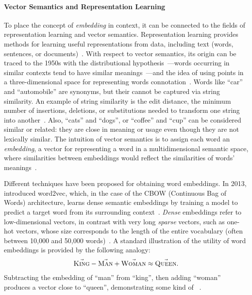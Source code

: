 \paragraph{Vector Semantics and Representation Learning}
To place the concept of \emph{embedding} in context, it can be connected to the fields of representation learning and vector semantics.
Representation learning provides methods for learning useful representations from data, including text (words, sentences, or documents)~\cite{bengio_representation_learning_2013}.
With respect to vector semantics, its origin can be traced to the 1950s with the distributional hypothesis~\cite{Harris01081954}---\ie words occurring in similar contexts tend to have similar meanings~\cite{jm3}---and the idea of using points in a three-dimensional space for representing words connotation~\cite{osgood1957}.
Words like ``car'' and ``automobile'' are synonyms, but their  cannot be captured via string similarity. An example of string similarity is the edit distance, \ie the minimum number of insertions, deletions, or substitutions needed to transform one string into another~\cite{jm3}.
Also, ``cats'' and ``dogs'', or ``coffee'' and ``cup'' can be considered similar or related: they are close in meaning or usage even though they are not lexically similar.
The intuition of vector semantics is to assign each word an \emph{embedding}, \ie a vector for representing a word in a multidimensional semantic space, where similarities between embeddings would reflect the similarities of words' meanings~\cite{jm3}.

Different techniques have been proposed for obtaining word embeddings. In 2013, \textcite{mikolov2013} introduced word2vec, which, in the case of the CBOW (Continuous Bag of Words) architecture, learns dense semantic embeddings by training a model to predict a target word from its surrounding context~\cite{mikolov2013}. \emph{Dense} embeddings refer to low-dimensional vectors, in contrast with very long \emph{sparse} vectors, such as one-hot vectors, whose size corresponds to the length of the entire vocabulary (often between 10,000 and 50,000 words)~\cite{jm3}.
%
A standard illustration of the utility of word embeddings is provided by the following analogy:
\begin{equation}
\vec{\textsc{King}} - \vec{\textsc{Man}} + \vec{\textsc{Woman}} \approx \vec{\textsc{Queen}}.
\end{equation}
Subtracting the embedding of ``man'' from ``king'', then adding ``woman'' produces a vector close to ``queen'', demonstrating some kind of  ~\cite{mikolov-etal-2013-linguistic}.

